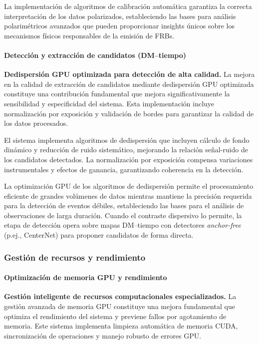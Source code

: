 La implementación de algoritmos de calibración automática garantiza la correcta interpretación de los datos polarizados, estableciendo las bases para análisis polarimétricos avanzados que pueden proporcionar insights únicos sobre los mecanismos físicos responsables de la emisión de FRBs.

\paragraph{Detección y extracción de candidatos (DM--tiempo)}

\noindent\textbf{Dedispersión GPU optimizada para detección de alta calidad.} La mejora en la calidad de extracción de candidatos mediante dedispersión GPU optimizada constituye una contribución fundamental que mejora significativamente la sensibilidad y especificidad del sistema. Esta implementación incluye normalización por exposición y validación de bordes para garantizar la calidad de los datos procesados.

El sistema implementa algoritmos de dedispersión que incluyen cálculo de fondo dinámico y reducción de ruido sistemático, mejorando la relación señal-ruido de los candidatos detectados. La normalización por exposición compensa variaciones instrumentales y efectos de ganancia, garantizando coherencia en la detección.

La optimización GPU de los algoritmos de dedispersión permite el procesamiento eficiente de grandes volúmenes de datos mientras mantiene la precisión requerida para la detección de eventos débiles, estableciendo las bases para el análisis de observaciones de larga duración. Cuando el contraste dispersivo lo permite, la etapa de detección opera sobre mapas DM--tiempo con detectores \emph{anchor-free} (p.ej., CenterNet) para proponer candidatos de forma directa.

\subsubsection{Gestión de recursos y rendimiento}
\paragraph{Optimización de memoria GPU y rendimiento}

\noindent\textbf{Gestión inteligente de recursos computacionales especializados.} La gestión avanzada de memoria GPU constituye una mejora fundamental que optimiza el rendimiento del sistema y previene fallos por agotamiento de memoria. Este sistema implementa limpieza automática de memoria CUDA, sincronización de operaciones y manejo robusto de errores GPU.

